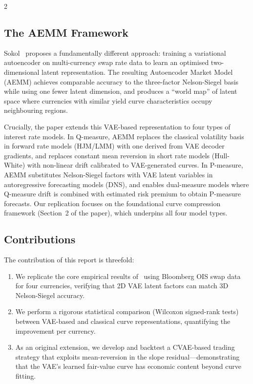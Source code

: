 \documentclass[10pt,a4paper]{article}
\theoremstyle{plain}
\theoremstyle{definition}
\begin{document}
\begin{multicols}{2}
\subsection{The AEMM Framework}

Sokol~\cite{sokol2022} proposes a fundamentally different approach: training a variational autoencoder on multi-currency swap rate data to learn an optimised two-dimensional latent representation. The resulting Autoencoder Market Model (AEMM) achieves comparable accuracy to the three-factor Nelson-Siegel basis while using one fewer latent dimension, and produces a ``world map'' of latent space where currencies with similar yield curve characteristics occupy neighbouring regions.

Crucially, the paper extends this VAE-based representation to four types of interest rate models. In Q-measure, AEMM replaces the classical volatility basis in forward rate models (HJM/LMM) with one derived from VAE decoder gradients, and replaces constant mean reversion in short rate models (Hull-White) with non-linear drift calibrated to VAE-generated curves. In P-measure, AEMM substitutes Nelson-Siegel factors with VAE latent variables in autoregressive forecasting models (DNS), and enables dual-measure models where Q-measure drift is combined with estimated risk premium to obtain P-measure forecasts. Our replication focuses on the foundational curve compression framework (Section~2 of the paper), which underpins all four model types.

\subsection{Contributions}

The contribution of this report is threefold:
\begin{enumerate}[nosep]
\item We replicate the core empirical results of~\cite{sokol2022} using Bloomberg OIS swap data for four currencies, verifying that 2D VAE latent factors can match 3D Nelson-Siegel accuracy.
\item We perform a rigorous statistical comparison (Wilcoxon signed-rank tests) between VAE-based and classical curve representations, quantifying the improvement per currency.
\item As an original extension, we develop and backtest a CVAE-based trading strategy that exploits mean-reversion in the slope residual---demonstrating that the VAE's learned fair-value curve has economic content beyond curve fitting.
\end{enumerate}


\end{multicols}
\end{document}
